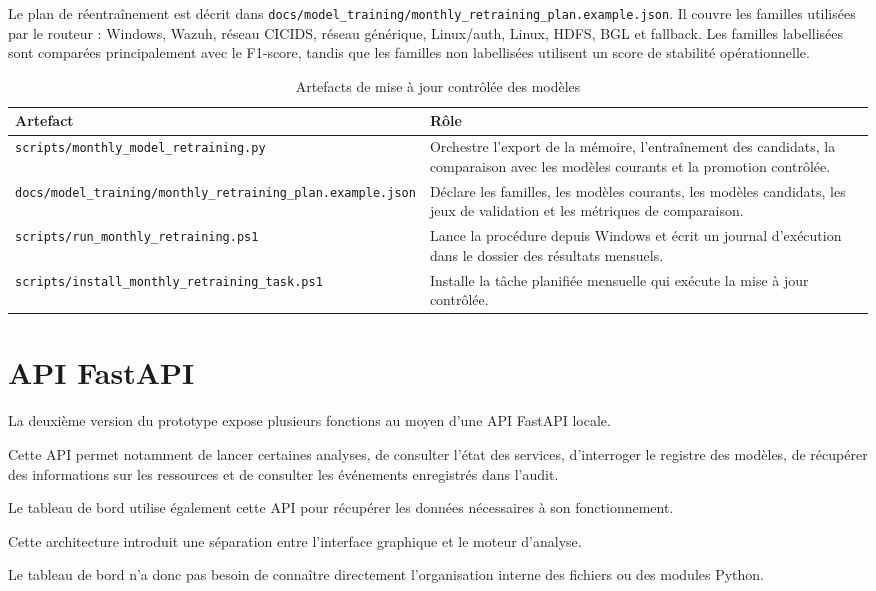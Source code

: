 Le plan de réentraînement est décrit dans \texttt{docs/model\_training/monthly\_retraining\_plan.example.json}. Il couvre les familles utilisées par le routeur : Windows, Wazuh, réseau CICIDS, réseau générique, Linux/auth, Linux, HDFS, BGL et fallback. Les familles labellisées sont comparées principalement avec le F1-score, tandis que les familles non labellisées utilisent un score de stabilité opérationnelle.

\begin{table}[H]
\centering
\caption{Artefacts de mise à jour contrôlée des modèles}
\label{tab:artefacts-maj-modeles}
\small
\begin{tabularx}{\textwidth}{p{4.5cm}X}
\toprule
\textbf{Artefact} & \textbf{Rôle} \tabularnewline
\midrule
\texttt{scripts/monthly\_model\_retraining.py} &
Orchestre l'export de la mémoire, l'entraînement des candidats, la comparaison avec les modèles courants et la promotion contrôlée. \tabularnewline
\texttt{docs/model\_training/monthly\_retraining\_plan.example.json} &
Déclare les familles, les modèles courants, les modèles candidats, les jeux de validation et les métriques de comparaison. \tabularnewline
\texttt{scripts/run\_monthly\_retraining.ps1} &
Lance la procédure depuis Windows et écrit un journal d'exécution dans le dossier des résultats mensuels. \tabularnewline
\texttt{scripts/install\_monthly\_retraining\_task.ps1} &
Installe la tâche planifiée mensuelle qui exécute la mise à jour contrôlée. \tabularnewline
\bottomrule
\end{tabularx}
\end{table}

\section{API FastAPI}

La deuxième version du prototype expose plusieurs fonctions au moyen d'une API FastAPI locale.

Cette API permet notamment de lancer certaines analyses, de consulter l'état des services, d'interroger le registre des modèles, de récupérer des informations sur les ressources et de consulter les événements enregistrés dans l'audit.

Le tableau de bord utilise également cette API pour récupérer les données nécessaires à son fonctionnement.

Cette architecture introduit une séparation entre l'interface graphique et le moteur d'analyse.

Le tableau de bord n'a donc pas besoin de connaître directement l'organisation interne des fichiers ou des modules Python.

